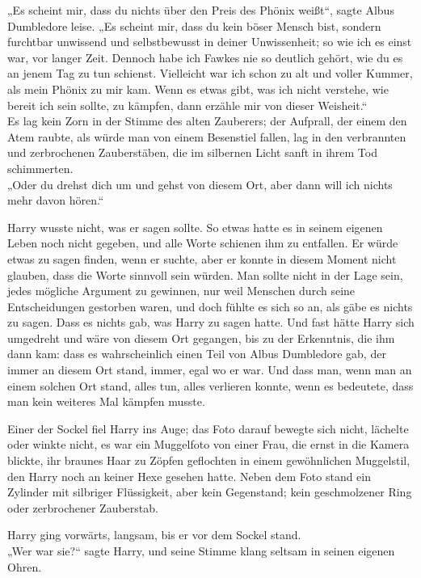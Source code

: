 {„Es scheint mir, dass du nichts über den Preis des Phönix weißt“, sagte Albus Dumbledore leise. „Es scheint mir, dass du kein böser Mensch bist, sondern furchtbar unwissend und selbstbewusst in deiner Unwissenheit; so wie ich es einst war, vor langer Zeit. Dennoch habe ich Fawkes nie so deutlich gehört, wie du es an jenem Tag zu tun schienst. Vielleicht war ich schon zu alt und voller Kummer, als mein Phönix zu mir kam. Wenn es etwas gibt, was ich nicht verstehe, wie bereit ich sein sollte, zu kämpfen, dann erzähle mir von dieser Weisheit.“\\ Es lag kein Zorn in der Stimme des alten Zauberers; der Aufprall, der einem den Atem raubte, als würde man von einem Besenstiel fallen, lag in den verbrannten und zerbrochenen Zauberstäben, die im silbernen Licht sanft in ihrem Tod schimmerten.\\ „Oder du drehst dich um und gehst von diesem Ort, aber dann will ich nichts mehr davon hören.“

Harry wusste nicht, was er sagen sollte. So etwas hatte es in seinem eigenen Leben noch nicht gegeben, und alle Worte schienen ihm zu entfallen. Er würde etwas zu sagen finden, wenn er suchte, aber er konnte in diesem Moment nicht glauben, dass die Worte sinnvoll sein würden. Man sollte nicht in der Lage sein, jedes mögliche Argument zu gewinnen, nur weil Menschen durch seine Entscheidungen gestorben waren, und doch fühlte es sich so an, als gäbe es nichts zu sagen. Dass es nichts gab, was Harry zu sagen hatte. Und fast hätte Harry sich umgedreht und wäre von diesem Ort gegangen, bis zu der Erkenntnis, die ihm dann kam: dass es wahrscheinlich einen Teil von Albus Dumbledore gab, der immer an diesem Ort stand, immer, egal wo er war. Und dass man, wenn man an einem solchen Ort stand, alles tun, alles verlieren konnte, wenn es bedeutete, dass man kein weiteres Mal kämpfen musste.

Einer der Sockel fiel Harry ins Auge; das Foto darauf bewegte sich nicht, lächelte oder winkte nicht, es war ein Muggelfoto von einer Frau, die ernst in die Kamera blickte, ihr braunes Haar zu Zöpfen geflochten in einem gewöhnlichen Muggelstil, den Harry noch an keiner Hexe gesehen hatte. Neben dem Foto stand ein Zylinder mit silbriger Flüssigkeit, aber kein Gegenstand; kein geschmolzener Ring oder zerbrochener Zauberstab.

Harry ging vorwärts, langsam, bis er vor dem Sockel stand.\\ „Wer war sie?“ sagte Harry, und seine Stimme klang seltsam in seinen eigenen Ohren.

}
